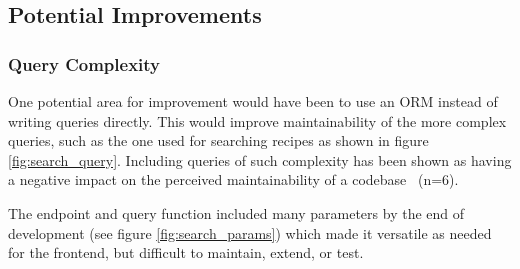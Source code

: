 \subsection{Potential Improvements}

\subsubsection{Query Complexity}\label{sec:search_complexity}
One potential area for improvement would have been to use an ORM instead of
writing queries directly. This would improve maintainability of the more complex
queries, such as the one used for searching recipes as shown in figure \ref{fig:search_query}.
Including queries of such complexity has been shown as having a negative impact on the perceived
maintainability of a codebase~\cite{yamashita_code_2012} (n=6).

The endpoint and query function included many parameters by the end of development
(see figure \ref{fig:search_params}) which made it versatile as needed for the frontend,
but difficult to maintain, extend, or test.
